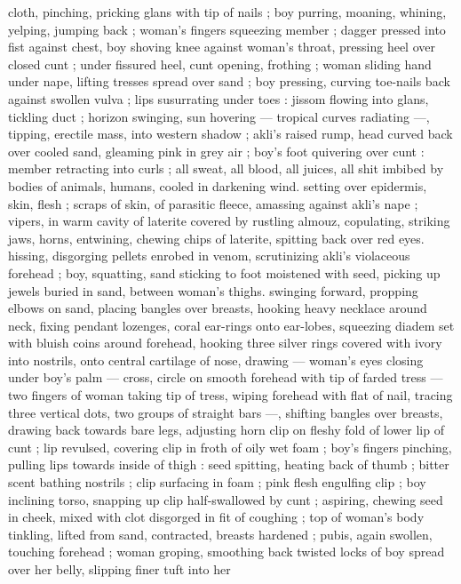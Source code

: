 cloth, pinching, pricking glans with tip of nails ; boy purring,
moaning, whining, yelping, jumping back ; woman's fingers
squeezing member ; dagger pressed into fist against chest, boy
shoving knee against woman's throat, pressing heel over closed cunt
; under fissured heel, cunt opening, frothing ; woman sliding hand
under nape, lifting tresses spread over sand ; boy pressing, curving
toe-nails back against swollen vulva ; lips susurrating under toes :
jissom flowing into glans, tickling duct ; horizon swinging, sun
hovering --- tropical curves radiating ---, tipping, erectile mass, into
western shadow ; akli’s raised rump, head curved back over cooled
sand, gleaming pink in grey air ; boy's foot quivering over cunt :
member retracting into curls ; all sweat, all blood, all juices, all shit
imbibed by bodies of animals, humans, cooled in darkening wind.
setting over epidermis, skin, flesh ; scraps of skin, of parasitic
fleece, amassing against akli's nape ; vipers, in warm cavity of
laterite covered by rustling almouz, copulating, striking jaws, horns,
entwining, chewing chips of laterite, spitting back over red eyes.
hissing, disgorging pellets enrobed in venom, scrutinizing akli's
violaceous forehead ; boy, squatting, sand sticking to foot moistened
with seed, picking up jewels buried in sand, between woman's thighs.
swinging forward, propping elbows on sand, placing bangles over
breasts, hooking heavy necklace around neck, fixing pendant
lozenges, coral ear-rings onto ear-lobes, squeezing diadem set with
bluish coins around forehead, hooking three silver rings covered with
ivory into nostrils, onto central cartilage of nose, drawing ---
woman's eyes closing under boy's palm --- cross, circle on smooth
forehead with tip of farded tress --- two fingers of woman taking tip
of tress, wiping forehead with flat of nail, tracing three vertical dots,
two groups of straight bars ---, shifting bangles over breasts,
drawing back towards bare legs, adjusting horn clip on fleshy fold of
lower lip of cunt ; lip revulsed, covering clip in froth of oily wet foam
; boy's fingers pinching, pulling lips towards inside of thigh : seed
spitting, heating back of thumb ; bitter scent bathing nostrils ; clip
surfacing in foam ; pink flesh engulfing clip ; boy inclining torso,
snapping up clip half-swallowed by cunt ; aspiring, chewing seed in
cheek, mixed with clot disgorged in fit of coughing ; top of woman's
body tinkling, lifted from sand, contracted, breasts hardened ; pubis,
again swollen, touching forehead ; woman groping, smoothing back
twisted locks of boy spread over her belly, slipping finer tuft into her
